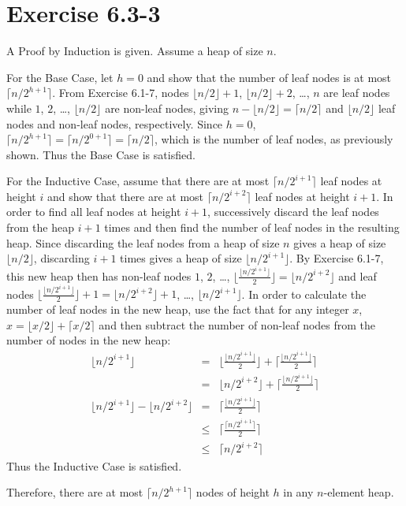 \documentclass{article}
\begin{document}
\section*{Exercise 6.3-3}

A Proof by Induction is given. Assume a heap of size $n$.

For the Base Case, let $h = 0$ and show that the number of leaf nodes is at most $\lceil n / 2^{h+1} \rceil$. From Exercise 6.1-7, nodes $\lfloor n / 2 \rfloor + 1$, $\lfloor n / 2 \rfloor + 2$, \ldots, $n$ are leaf nodes while $1$, $2$, \ldots, $\lfloor n / 2 \rfloor$ are non-leaf nodes, giving $n - \lfloor n / 2 \rfloor = \lceil n / 2 \rceil$ and $\lfloor n / 2 \rfloor$ leaf nodes and non-leaf nodes, respectively. Since $h = 0$, $\lceil n / 2^{h+1} \rceil = \lceil n / 2^{0+1} \rceil = \lceil n / 2 \rceil$, which is the number of leaf nodes, as previously shown. Thus the Base Case is satisfied.

For the Inductive Case, assume that there are at most $\lceil n / 2^{i+1} \rceil$ leaf nodes at height $i$ and show that there are at most $\lceil n / 2^{i+2} \rceil$ leaf nodes at height $i + 1$. In order to find all leaf nodes at height $i + 1$, successively discard the leaf nodes from the heap $i+1$ times and then find the number of leaf nodes in the resulting heap. Since discarding the leaf nodes from a heap of size $n$ gives a heap of size $\lfloor n / 2 \rfloor$, discarding $i + 1$ times gives a heap of size $\lfloor n / 2^{i+1} \rfloor$. By Exercise 6.1-7, this new heap then has non-leaf nodes $1$, $2$, \ldots, $\lfloor \frac{\lfloor n / 2^{i+1} \rfloor}{2} \rfloor = \lfloor n / 2^{i+2} \rfloor$ and leaf nodes $\lfloor \frac{\lfloor n / 2^{i+1} \rfloor}{2} \rfloor + 1 = \lfloor n / 2^{i+2} \rfloor + 1$, \ldots, $\lfloor n / 2^{i+1} \rfloor$. In order to calculate the number of leaf nodes in the new heap, use the fact that for any integer $x$, $x = \lfloor x / 2 \rfloor + \lceil x / 2 \rceil$ and then subtract the number of non-leaf nodes from the number of nodes in the new heap:
\begin{eqnarray*}
	\lfloor n / 2^{i+1} \rfloor & = & \lfloor \frac{\lfloor n / 2^{i+1} \rfloor}{2} \rfloor + \lceil \frac{\lfloor n / 2^{i+1} \rfloor}{2} \rceil \\
	& = & \lfloor n / 2^{i+2} \rfloor + \lceil \frac{ \lfloor n / 2^{i+1} \rfloor}{2} \rceil \\
	\lfloor n / 2^{i+1} \rfloor - \lfloor n / 2^{i+2} \rfloor & = & \lceil \frac{\lfloor n / 2^{i+1} \rfloor}{2} \rceil \\
	& \leq & \lceil \frac{\lceil n / 2^{i+1} \rceil}{2} \rceil \\
	& \leq & \lceil n / 2^{i+2} \rceil
\end{eqnarray*}
Thus the Inductive Case is satisfied.

Therefore, there are at most $\lceil n / 2^{h+1} \rceil$ nodes of height $h$ in any $n$-element heap.
\end{document}

